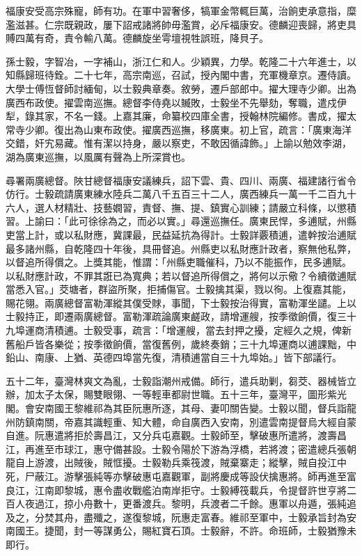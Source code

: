 \begin{pinyinscope}
福康安受高宗殊寵，師有功。在軍中習奢侈，犒軍金幣輒巨萬，治餉吏承意指，糜濫滋甚。仁宗既親政，屢下詔戒諸將帥毋濫賞，必斥福康安。德麟迎喪歸，將吏具賻四萬有奇，責令輸八萬。德麟旋坐雩壇視牲誤班，降貝子。

孫士毅，字智冶，一字補山，浙江仁和人。少穎異，力學。乾隆二十六年進士，以知縣歸班待銓。二十七年，高宗南巡，召試，授內閣中書，充軍機章京。遷侍讀。大學士傅恆督師討緬甸，以士毅典章奏。敘勞，遷戶部郎中。擢大理寺少卿。出為廣西布政使。擢雲南巡撫。總督李侍堯以贓敗，士毅坐不先舉劾，奪職，遣戍伊犁，錄其家，不名一錢。上嘉其廉，命纂校四庫全書，授翰林院編修。書成，擢太常寺少卿。復出為山東布政使。擢廣西巡撫，移廣東。初上官，疏言：「廣東海洋交錯，奸宄易藏。惟有潔以持身，嚴以察吏，不敢因循諱飾。」上諭以勉效李湖，湖為廣東巡撫，以風厲有聲為上所深賞也。

尋署兩廣總督。陜甘總督福康安議練兵，詔下雲、貴、四川、兩廣、福建諸行省令仿行。士毅疏請廣東練水陸兵二萬八千五百三十二人，廣西練兵一萬一千二百九十六人，選人材精壯、技藝嫺習，責督、撫、提、鎮實心訓練；請嚴立科條，以懲積習。上諭曰：「此可徐徐為之，而必以實。」尋還巡撫任。廣東民悍，多逋賦，州縣吏當上計，或以私財應，冀課最，民益延抗為得計。士毅詳覈積逋，遣幹按治逋賦最多諸州縣，自乾隆四十年後，具冊督追。州縣吏以私財應計政者，察無他私弊，以督追所得償之。上獎其能，惟謂：「州縣吏職催科，乃以不能振作，民多逋賦。以私財應計政，不罪其誑已為寬典；若以督追所得償之，將何以示儆？令續徵逋賦當悉入官。」茭塘者，群盜所聚，拒捕傷官。士毅擒其渠，戮以徇。上復嘉其能，賜花翎。兩廣總督富勒渾縱其僕受賕，事聞，下士毅按治得實，富勒渾坐譴。上以士毅持正，即遷兩廣總督。富勒渾疏論廣東鹺政，請增運艘，按季徵餉價，復三十九埠運商清積逋。士毅受事，疏言：「增運艘，當去封押之擾，定經久之規，俾新舊船戶皆各樂從；按季徵餉價，當復舊例，歲終奏銷；三十九埠運商以逋課黜，中鉛山、南康、上猶、英德四埠當先復，清積逋當自三十九埠始。」皆下部議行。

五十二年，臺灣林爽文為亂，士毅詣潮州戒備。師行，遣兵助剿，芻茭、器械皆立辦，加太子太保，賜雙眼翎、一等輕車都尉世職。五十三年，臺灣平，圖形紫光閣。會安南國王黎維祁為其臣阮惠所逐，其母、妻叩關告變。士毅以聞，督兵詣龍州防鎮南關，帝嘉其識輕重、知大體，命自廣西入安南，別遣雲南提督烏大經自蒙自進。阮惠遣將拒於壽昌江，又分兵屯嘉觀。士毅師至，擊破惠所遣將，渡壽昌江，再進至市球江，惠守備甚設。士毅令陽於下游為浮橋，若將渡；密遣總兵張朝龍自上游渡，出賊後，賊恇擾。士毅勒兵乘筏渡，賊棄寨走；縱擊，賊自投江中死，尸蔽江。游擊張純等亦擊破惠屯嘉觀軍，副將慶成等設伏擒惠將。師再進至富良江，江南即黎城，惠令盡收戰艦泊南岸拒守。士毅縛筏載兵，令提督許世亨將二百人夜過江，掠小舟數十，更番渡兵。黎明，兵渡者二千餘。惠軍以舟遁，張純追及之，分焚其舟，盡殲之，遂復黎城，阮惠走富春。維祁至軍中，士毅承旨封為安南國王。捷聞，封一等謀勇公，賜紅寶石頂。士毅辭，不許。命班師，士毅猶豫未即行。


\end{pinyinscope}
